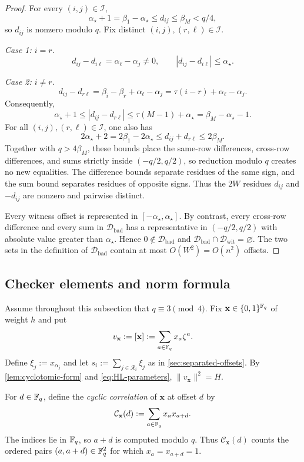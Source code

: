 \begin{proof}
For every $(i,j)\in\mathcal I$,
\[
 \alpha_\star+1=\beta_1-\alpha_\star
 \le d_{ij}\le\beta_M<q/4,
\]
so $d_{ij}$ is nonzero modulo $q$.  Fix distinct
$(i,j),(r,\ell)\in\mathcal I$.

\smallskip
\noindent\emph{Case 1: $i=r$.}
\[
 d_{ij}-d_{i\ell}=\alpha_\ell-\alpha_j\ne0,
 \qquad
 |d_{ij}-d_{i\ell}|\le\alpha_\star.
\]

\smallskip
\noindent\emph{Case 2: $i\ne r$.}
\[
 d_{ij}-d_{r\ell}
 =\beta_i-\beta_r+\alpha_\ell-\alpha_j
 =\tau(i-r)+\alpha_\ell-\alpha_j.
\]
Consequently,
\[
 \alpha_\star+1\le|d_{ij}-d_{r\ell}|
 \le \tau(M-1)+\alpha_\star=\beta_M-\alpha_\star-1.
\]
For all $(i,j),(r,\ell)\in\mathcal I$, one also has
\[
 2\alpha_\star+2=2\beta_1-2\alpha_\star
 \le d_{ij}+d_{r\ell}\le2\beta_M.
\]
Together with $q>4\beta_M$, these bounds place the same-row differences,
cross-row differences, and sums strictly inside $(-q/2,q/2)$, so reduction
modulo $q$ creates no new equalities.  The difference bounds separate residues
of the same sign, and the sum bound separates residues of opposite signs.
Thus the $2W$ residues $d_{ij}$ and $-d_{ij}$ are nonzero and pairwise
distinct.

Every witness offset is represented in
$[-\alpha_\star,\alpha_\star]$.  By contrast, every cross-row difference and
every sum in $\mathcal D_{\mathrm{bad}}$ has a representative in
$(-q/2,q/2)$ with absolute value greater than $\alpha_\star$.  Hence
$0\notin\mathcal D_{\mathrm{bad}}$ and
$\mathcal D_{\mathrm{bad}}\cap\mathcal D_{\mathrm{wit}}=\varnothing$.
The two sets in the definition of $\mathcal D_{\mathrm{bad}}$ contain at most
$O(W^2)=O(n^2)$ offsets.
\end{proof}

\subsection{Checker elements and norm formula}
\label{sec:checker-construction}

Assume throughout this subsection that $q\equiv3\pmod4$.  Fix
$\mathbf x\in\{0,1\}^{\mathbb F_q}$ of weight $h$ and put
\[
 v_{\mathbf x}:=[\mathbf x]
 :=\sum_{a\in\mathbb F_q}x_a\zeta^a.
\]
Define $\xi_j:=x_{\alpha_j}$ and let
$s_i:=\sum_{j\in\mathcal R_i}\xi_j$ as in \cref{sec:separated-offsets}.  By
\cref{lem:cyclotomic-form} and
\cref{eq:HL-parameters}, $\|v_{\mathbf x}\|^2=H$.

For $d\in\mathbb F_q$, define the \emph{cyclic correlation} of $\mathbf x$ at
offset $d$ by
\begin{equation*}
 \mathcal{C}_{\mathbf x}(d):=\sum_{a\in\mathbb F_q}x_ax_{a+d}.
\end{equation*}
The indices lie in $\mathbb F_q$, so $a+d$ is computed modulo $q$.
Thus $\mathcal C_{\mathbf x}(d)$ counts the ordered pairs
$(a,a+d)\in\mathbb F_q^2$ for which $x_a=x_{a+d}=1$.

